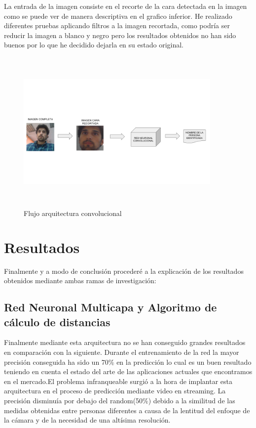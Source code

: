 \documentclass{article}
\begin{document}
La entrada de la imagen consiste en el recorte de la cara detectada en la imagen como se puede ver de manera descriptiva en el grafico inferior. He realizado diferentes pruebas aplicando filtros a la imagen recortada, como podría ser reducir la imagen a blanco y negro pero los resultados obtenidos no han sido buenos por lo que he decidido dejarla en su estado original.

\begin{figure}[H]
  \centering
  \includegraphics[width=100mm, height=80mm]{images/Flowchart_conv.png}
  \caption{Flujo arquitectura convolucional}
\end{figure}

\section{Resultados}
Finalmente y a modo de conclusión procederé a la explicación de los resultados obtenidos mediante ambas ramas de investigación:

\subsection{Red Neuronal Multicapa y Algoritmo de cálculo de distancias}
Finalmente mediante esta arquitectura no se han conseguido grandes resultados en comparación con la siguiente.
Durante el entrenamiento de la red la mayor precisión conseguida ha sido un 70\% en la predicción lo cual es un buen resultado teniendo en cuenta el estado del arte de las aplicaciones actuales que encontramos en el mercado.\newline El problema infranqueable surgió a la hora de implantar esta arquitectura en el proceso de predicción mediante video en streaming. La precisión disminuía por debajo del random(50\%) debido a la similitud de las medidas obtenidas entre personas diferentes a causa de la lentitud del enfoque de la cámara y de la necesidad de una altísima resolución.
\end{document}
